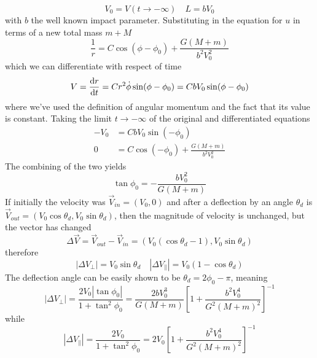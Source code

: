 \begin{equation}
    V_{0} = V(t\to-\infty) \quad L = bV_{0}
\end{equation}
with $b$ the well known impact parameter. Substituting in the equation for $u$ in terms of a new total mass $m+M$
\begin{equation*}
    \frac{1}{r} = C\cos(\phi-\phi_{0}) +\frac{G(M+m)}{b^{2}V_{0}^{2}}
\end{equation*}
which we can differentiate with respect of time 
\begin{equation}
    V = \frac{\text{d}r}{\text{d}t} = Cr^{2}\dot{\phi}\sin(\phi-\phi_{0}) = CbV_{0}\sin(\phi-\phi_{0})
\end{equation}
where we've used the definition of angular momentum and the fact that its value is constant. Taking the limit $t\to-\infty$ of the original and differentiated equations
\begin{align*}
    -V_{0} &= CbV_{0}\sin(-\phi_{0})\\
    0 &= C\cos(-\phi_{0})+\frac{G(M+m)}{b^{2}V_{0}^{2}}
\end{align*}
The combining of the two yields
\begin{equation*}
    \tan\phi_{0} = -\frac{bV_{0}^{2}}{G(M+m)}
\end{equation*}
If initially the velocity was $\vec{V}_{in} = (V_{0},0)$ and after a deflection by an angle $\theta_{d}$ is $\vec{V}_{out} = (V_{0}\cos\theta_{d},V_{0}\sin\theta_{d})$, then the magnitude of velocity is unchanged, but the vector has changed
\begin{equation*}
    \Delta\vec{V} = \vec{V}_{out}-\vec{V}_{in} = (V_{0}(\cos\theta_{d}-1),V_{0}\sin\theta_{d})
\end{equation*}
therefore
\begin{equation*}
    |\Delta V_{\perp}| = V_{0}\sin\theta_{d} \quad |\Delta V_{\parallel}| = V_{0}(1-\cos\theta_{d})
\end{equation*}
The deflection angle can be easily shown to be $\theta_{d} = 2\phi_{0}-\pi$, meaning
\begin{equation}
      |\Delta V_{\perp}| = \frac{2V_{0}|\tan\phi_{0}|}{1+\tan^{2}\phi_{0}} = \frac{2bV_{0}^{3}}{G(M+m)}\left[1+\frac{b^{2}V_{0}^{4}}{G^{2}(M+m)^{2}}\right]^{-1}
      \label{eq:ortoghonalvelocity_chandra}
\end{equation}
while 
\begin{equation}
    |\Delta V_{\parallel}| = \frac{2V_{0}}{1+\tan^{2}\phi_{0}} = 2V_{0}\left[1+\frac{b^{2}V_{0}^{4}}{G^{2}(M+m)^{2}}\right]^{-1}
    \label{eq:parallelvelocity_chandra}
\end{equation}
